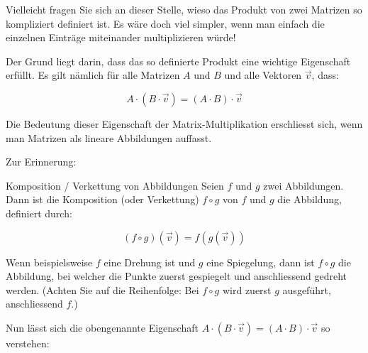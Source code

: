 Vielleicht fragen Sie sich an dieser Stelle, wieso das Produkt von zwei Matrizen so kompliziert definiert ist. Es wäre doch viel simpler, wenn man einfach die einzelnen Einträge miteinander multiplizieren würde!  

Der Grund liegt darin, dass das so definierte Produkt eine wichtige Eigenschaft erfüllt. Es gilt nämlich für alle Matrizen \( A \) und \( B \) und alle Vektoren \( \vec{v} \), dass:

\[
A \cdot (B \cdot \vec{v}) = (A \cdot B) \cdot \vec{v}
\]

Die Bedeutung dieser Eigenschaft der Matrix-Multiplikation erschliesst sich, wenn man Matrizen als lineare Abbildungen auffasst.  

Zur Erinnerung:

\begin{definition}
    {Komposition / Verkettung von Abbildungen}{}
    Seien \( f \) und \( g \) zwei Abbildungen. Dann ist die Komposition (oder Verkettung) \( f \circ g \) von \( f \) und \( g \) die Abbildung, definiert durch:

    \[
    (f \circ g)(\vec{v}) = f(g(\vec{v}))
    \]


\end{definition}
Wenn beispielsweise \( f \) eine Drehung ist und \( g \) eine Spiegelung, dann ist \( f \circ g \) die Abbildung, bei welcher die Punkte zuerst gespiegelt und anschliessend gedreht werden.  
(Achten Sie auf die Reihenfolge: Bei \( f \circ g \) wird zuerst \( g \) ausgeführt, anschliessend \( f \).)

Nun lässt sich die obengenannte Eigenschaft $A \cdot (B \cdot \vec{v}) = (A \cdot B) \cdot \vec{v}$ so verstehen:

